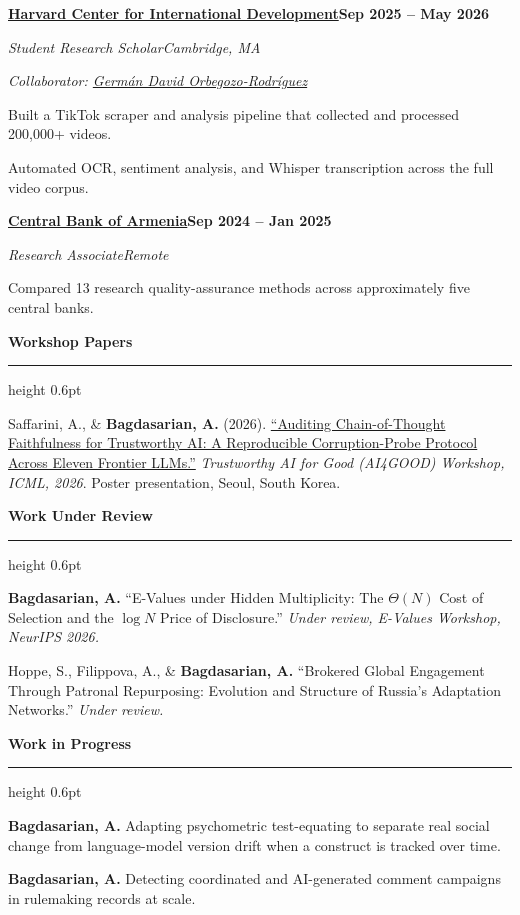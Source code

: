 \documentclass[11pt]{article}
\newcommand{\cvsection}[2][6\baselineskip]{%
  \Needspace{#1}%
  \vspace{5pt}%
  {\large\bfseries #2}\par
  \vspace{1pt}\hrule height 0.6pt \vspace{3pt}}
\newcommand{\cventry}[5][5\baselineskip]{%
  \Needspace{#1}%
  \vspace{2pt}%
  {\textbf{#2}\hfill\textbf{#3}\par}%
  {\textit{#4}\hfill\textit{#5}\par}%
}
\newcommand{\lnCID}{https://www.hks.harvard.edu/centers/cid}
\newcommand{\lnCBA}{https://www.cba.am/en/}
\newcommand{\lnICML}{https://openreview.net/forum?id=T9CoKxEx3X}
\newcommand{\lnOrbegozo}{https://www.iq.harvard.edu/people/german-orbegozo-rodriguez}
\begin{document}
\cventry{\href{\lnCID}{Harvard Center for International Development}}{Sep 2025 -- May 2026}
        {Student Research Scholar}{Cambridge, MA}
{\textit{Collaborator: \href{\lnOrbegozo}{Germán David Orbegozo-Rodríguez}}\par}
\begin{tight}
  \item Built a TikTok scraper and analysis pipeline that collected and processed 200{,}000+ videos.
  \item Automated OCR, sentiment analysis, and Whisper transcription across the full video corpus.
\end{tight}

\cventry[3.5\baselineskip]{\href{\lnCBA}{Central Bank of Armenia}}{Sep 2024 -- Jan 2025}
        {Research Associate}{Remote}
\begin{tight}
  \item Compared 13 research quality-assurance methods across approximately five central banks.
\end{tight}

\cvsection[5\baselineskip]{Workshop Papers}
\begin{tight}
  \item Saffarini, A., \& \textbf{Bagdasarian, A.} (2026).
        \href{\lnICML}{``Auditing Chain-of-Thought Faithfulness for Trustworthy AI: A Reproducible
        Corruption-Probe Protocol Across Eleven Frontier LLMs.''}
        \textit{Trustworthy AI for Good (AI4GOOD) Workshop, ICML, 2026}. Poster presentation, Seoul, South Korea.
\end{tight}

\cvsection{Work Under Review}
\begin{tight}
  \item \textbf{Bagdasarian, A.} ``E-Values under Hidden Multiplicity: The $\Theta(N)$ Cost of Selection
        and the $\log N$ Price of Disclosure.'' \textit{Under review, E-Values Workshop, NeurIPS 2026.}
  \item Hoppe, S., Filippova, A., \& \textbf{Bagdasarian, A.} ``Brokered Global Engagement Through
        Patronal Repurposing: Evolution and Structure of Russia's Adaptation Networks.''
        \textit{Under review.}
\end{tight}

\cvsection{Work in Progress}
\begin{tight}
  \item \textbf{Bagdasarian, A.} Adapting psychometric test-equating to separate real social change from
        language-model version drift when a construct is tracked over time.
  \item \textbf{Bagdasarian, A.} Detecting coordinated and AI-generated comment campaigns in rulemaking records at scale.
\end{tight}
\end{document}
